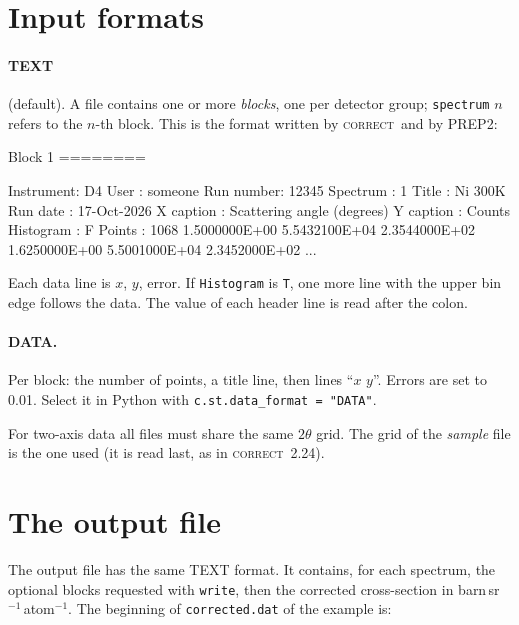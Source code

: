 \documentclass[11pt,a4paper]{report}
\newcommand{\cmd}[1]{\texttt{\color{accent}#1}}
\newcommand{\code}[1]{\texttt{#1}}
\newcommand{\file}[1]{\texttt{#1}}
\newcommand{\cor}{\textsc{correct}}
\begin{document}
\section{Input formats}

\paragraph{TEXT} (default). A file contains one or more \emph{blocks}, one per
detector group; \cmd{spectrum} $n$ refers to the $n$-th block. This is the format
written by \cor\ and by PREP2:

\begin{out}
 Block  1
 ========

 Instrument: D4
 User      : someone
 Run number:        12345
 Spectrum  :            1
 Title     : Ni 300K
 Run date  : 17-Oct-2026
 X caption : Scattering angle (degrees)
 Y caption : Counts
 Histogram :            F
 Points    :         1068
    1.5000000E+00    5.5432100E+04    2.3544000E+02
    1.6250000E+00    5.5001000E+04    2.3452000E+02
    ...
\end{out}
Each data line is $x$, $y$, error. If \code{Histogram} is \code{T}, one more
line with the upper bin edge follows the data. The value of each header line is
read after the colon.

\paragraph{DATA.} Per block: the number of points, a title line, then lines
``$x$ $y$''. Errors are set to 0.01. Select it in Python with
\code{c.st.data\_format = "DATA"}.

\begin{note}
For two-axis data all files must share the same $2\theta$ grid. The grid of the
\emph{sample} file is the one used (it is read last, as in \cor\ 2.24).
\end{note}

\section{The output file}

The output file has the same TEXT format. It contains, for each spectrum, the
optional blocks requested with \cmd{write}, then the corrected cross-section in
barn\,sr$^{-1}$\,atom$^{-1}$. The beginning of \file{corrected.dat} of the
example is:


\end{document}
